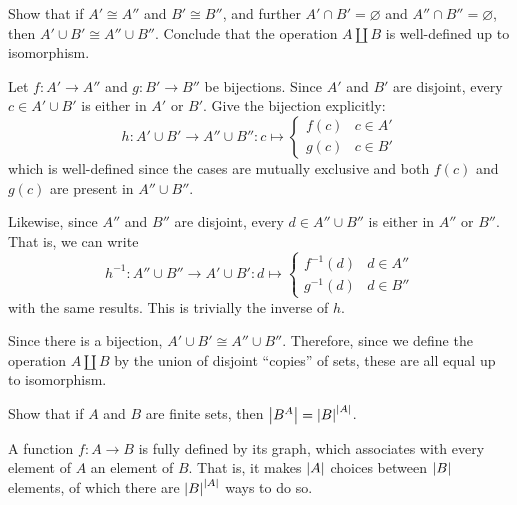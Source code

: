 \documentclass[notes,tikz]{agony}
\begin{document}
\begin{xca}
  Show that if $A' \cong A''$ and $B' \cong B''$,
  and further $A' \cap B' = \varnothing$ and $A'' \cap B'' = \varnothing$,
  then $A' \cup B' \cong A'' \cup B''$.
  Conclude that the operation $A \coprod B$ is well-defined up to isomorphism.
\end{xca}
\begin{prf}
  Let $f : A' \to A''$ and $g : B' \to B''$ be bijections.
  Since $A'$ and $B'$ are disjoint, every $c \in A' \cup B'$ is either in $A'$ or $B'$.
  Give the bijection explicitly:
  \[
    h : A' \cup B' \to A'' \cup B'' : c \mapsto \begin{cases}
      f(c) & c \in A' \\
      g(c) & c \in B'
    \end{cases}
  \]
  which is well-defined since the cases are mutually exclusive
  and both $f(c)$ and $g(c)$ are present in $A'' \cup B''$.

  Likewise, since $A''$ and $B''$ are disjoint, every $d \in A'' \cup B''$
  is either in $A''$ or $B''$. That is, we can write
  \[
    h^{-1} : A'' \cup B'' \to A' \cup B' : d \mapsto \begin{cases}
      f^{-1}(d) & d \in A'' \\
      g^{-1}(d) & d \in B''
    \end{cases}
  \]
  with the same results.
  This is trivially the inverse of $h$.

  Since there is a bijection, $A' \cup B' \cong A'' \cup B''$.
  Therefore, since we define the operation $A \coprod B$
  by the union of disjoint ``copies'' of sets,
  these are all equal up to isomorphism.
\end{prf}

\begin{xca}
  Show that if $A$ and $B$ are finite sets, then $\abs{B^A} = \abs{B}^{\abs{A}}$.
\end{xca}
\begin{prf}
  A function $f : A \to B$ is fully defined by its graph,
  which associates with every element of $A$ an element of $B$.
  That is, it makes $\abs{A}$ choices between $\abs{B}$ elements,
  of which there are $\abs{B}^{\abs{A}}$ ways to do so.
\end{prf}
\end{document}
